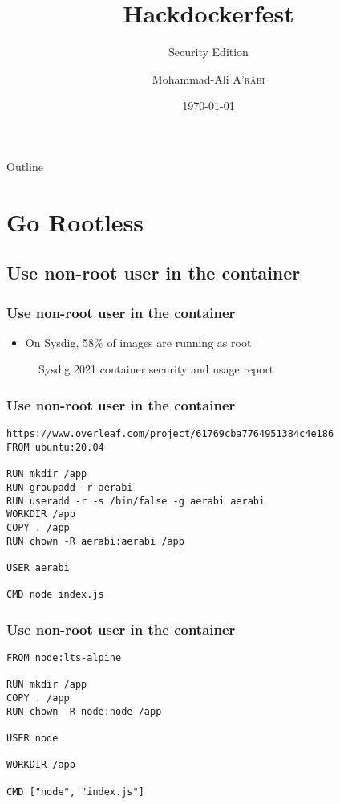 \documentclass[10pt, compress]{beamer}
\title{Hackdockerfest}
\subtitle{Security Edition}
\date{\today}
\author{Mohammad-Ali \textsc{A'r\^abi}}
\institute{Docker Community}
\begin{document}
\maketitle

\begin{frame}{Outline}
    \tableofcontents
\end{frame}

\section{Go Rootless}

\subsection{Use non-root user in the container}

\begin{frame}[fragile]
  \frametitle{Use non-root user in the container}
  
  \begin{itemize}
      \item  On Sysdig, 58\% of images are running as root
  \end{itemize}
  
  \begin{figure}
      \centering
      \caption{Sysdig 2021 container security and usage report}
  \end{figure}
\end{frame}

\begin{frame}[fragile]
  \frametitle{Use non-root user in the container}
  
  \begin{verbatim}https://www.overleaf.com/project/61769cba7764951384c4e186
FROM ubuntu:20.04

RUN mkdir /app
RUN groupadd -r aerabi
RUN useradd -r -s /bin/false -g aerabi aerabi
WORKDIR /app
COPY . /app
RUN chown -R aerabi:aerabi /app

USER aerabi

CMD node index.js
  \end{verbatim}
\end{frame}

\begin{frame}[fragile]
  \frametitle{Use non-root user in the container}
  
  \begin{verbatim}
FROM node:lts-alpine

RUN mkdir /app
COPY . /app
RUN chown -R node:node /app

USER node

WORKDIR /app

CMD ["node", "index.js"]
  \end{verbatim}

\end{frame}
\end{document}
